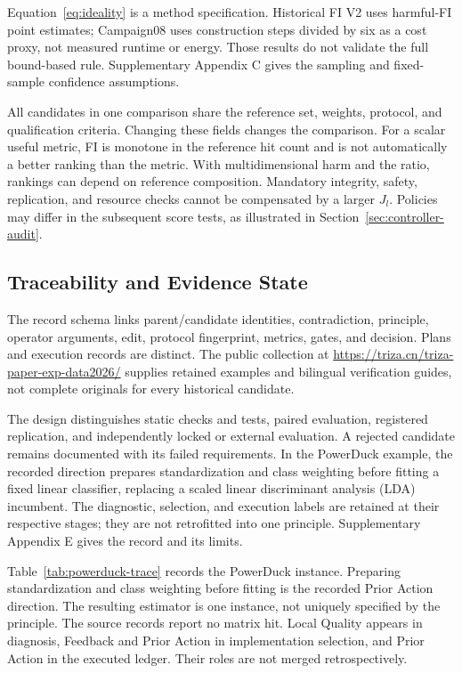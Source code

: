 \documentclass[sigconf]{acmart}
\begin{document}
Equation~\ref{eq:ideality} is a method specification. Historical FI V2
uses harmful-FI point estimates; Campaign08 uses construction steps divided
by six as a cost proxy, not measured runtime or energy. Those results do
not validate the full bound-based rule. Supplementary Appendix C gives
the sampling and fixed-sample confidence assumptions.

All candidates in one comparison share the reference set, weights,
protocol, and qualification criteria. Changing these fields changes the
comparison. For a scalar useful metric, FI is monotone in the reference
hit count and is not automatically a better ranking than the metric.
With multidimensional harm and the ratio, rankings can depend on reference
composition. Mandatory integrity, safety, replication, and resource checks
cannot be compensated by a larger $J_l$. Policies may differ in the
subsequent score tests, as illustrated in Section~\ref{sec:controller-audit}.

\subsection{Traceability and Evidence State}
\label{sec:traceability}

The record schema links parent/candidate identities, contradiction,
principle, operator arguments, edit, protocol fingerprint, metrics, gates,
and decision. Plans and execution records are distinct. The public
collection at \url{https://triza.cn/triza-paper-exp-data2026/} supplies
retained examples and bilingual verification guides, not complete
originals for every historical candidate.

The design distinguishes static checks and tests, paired evaluation,
registered replication, and independently locked or external evaluation.
A rejected candidate remains documented with its failed requirements.
In the PowerDuck example, the recorded direction prepares standardization
and class weighting before fitting a fixed linear classifier, replacing
a scaled linear discriminant analysis (LDA) incumbent. The diagnostic, selection, and execution labels
are retained at their respective stages; they are not retrofitted into
one principle. Supplementary Appendix E gives the record and its limits.

Table~\ref{tab:powerduck-trace} records the PowerDuck instance. Preparing
standardization and class weighting before fitting is the recorded Prior
Action direction. The resulting estimator is one instance, not uniquely
specified by the principle. The source records report no matrix hit.
Local Quality appears in diagnosis, Feedback and Prior Action in
implementation selection, and Prior Action in the executed ledger.
Their roles are not merged retrospectively.
\end{document}
